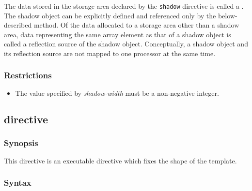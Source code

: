 The data stored in the storage area declared by the {\tt shadow}
directive is called a
. The shadow object can be explicitly defined and referenced
only by the below-described method. Of the data allocated to a storage
area other than a shadow area, data representing the same array
element as that of a shadow object is called a reflection source of
the shadow object. Conceptually, a shadow object and its reflection
source are not mapped to one processor at the same time.

\subsubsection*{Restrictions}

\begin{itemize}
\item The value specified by {\it shadow-width} must be a
non-negative integer. 
\end{itemize}

\subsection{ directive}
\subsubsection*{Synopsis}
This directive is an executable directive which fixes the shape of the
template. 

\subsubsection*{Syntax}

